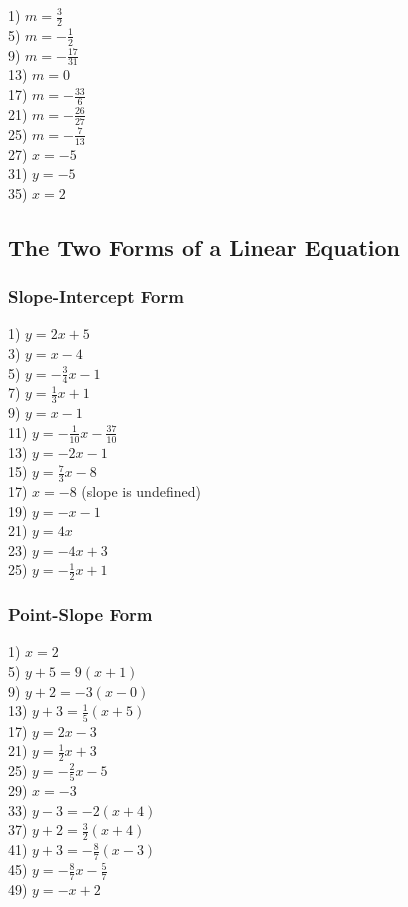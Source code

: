 \documentclass[11pt]{book}
\begin{document}
\begin{multicols}{2}
1) $m=\frac{3}{2}$\\
5) $m=-\frac{1}{2}$\\
9) $m=-\frac{17}{31}$\\
13) $m=0$\\
17) $m=-\frac{33}{6}$\\
21) $m=-\frac{26}{27}$\\
25) $m=-\frac{7}{13}$\\
27) $x=-5$\\
31) $y=-5$\\
35) $x=2$
\end{multicols}

\subsection*{The Two Forms of a Linear Equation}

\subsubsection{Slope-Intercept Form}

\begin{multicols}{2}
1) $y=2x+5$\\
3) $y=x-4$\\
5) $y=-\frac{3}{4}x-1$\\
7) $y=\frac{1}{3}x+1$\\
9) $y=x-1$\\
11) $y=-\frac{1}{10}x-\frac{37}{10}$\\
13) $y=-2x-1$\\
15) $y=\frac{7}{3}x-8$\\
17) $x=-8$ (slope is undefined)\\
19) $y=-x-1$\\
21) $y=4x$\\
23) $y=-4x+3$\\
25) $y=-\frac{1}{2}x+1$
\end{multicols}

\subsubsection{Point-Slope Form}

\begin{multicols}{2}
1) $x=2$\\
5) $y+5=9(x+1)$\\
9) $y+2=-3(x-0)$\\
13) $y+3=\frac{1}{5}(x+5)$\\
17) $y=2x-3$\\
21) $y=\frac{1}{2}x+3$\\
25) $y=-\frac{2}{5}x-5$\\
29) $x=-3$\\
33) $y-3=-2(x+4)$\\
37) $y+2=\frac{3}{2}(x+4)$\\
41) $y+3=-\frac{8}{7}(x-3)$\\
45) $y=-\frac{8}{7}x-\frac{5}{7}$\\
49) $y=-x+2$
\end{multicols}
\end{document}
